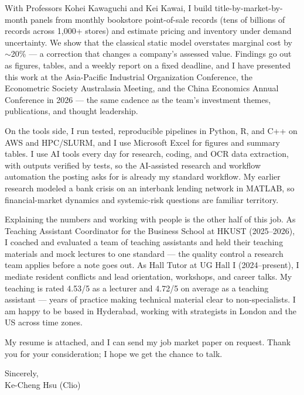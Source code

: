 \documentclass[11pt,letterpaper]{article}
\begin{document}
With Professors Kohei Kawaguchi and Kei Kawai, I build title-by-market-by-month panels from monthly bookstore point-of-sale records (tens of billions of records across 1{,}000+ stores) and estimate pricing and inventory under demand uncertainty. We show that the classical static model overstates marginal cost by \(\sim\)20\% --- a correction that changes a company's assessed value. Findings go out as figures, tables, and a weekly report on a fixed deadline, and I have presented this work at the Asia-Pacific Industrial Organization Conference, the Econometric Society Australasia Meeting, and the China Economics Annual Conference in 2026 --- the same cadence as the team's investment themes, publications, and thought leadership.

On the tools side, I run tested, reproducible pipelines in Python, R, and C++ on AWS and HPC/SLURM, and I use Microsoft Excel for figures and summary tables. I use AI tools every day for research, coding, and OCR data extraction, with outputs verified by tests, so the AI-assisted research and workflow automation the posting asks for is already my standard workflow. My earlier research modeled a bank crisis on an interbank lending network in MATLAB, so financial-market dynamics and systemic-risk questions are familiar territory.

Explaining the numbers and working with people is the other half of this job. As Teaching Assistant Coordinator for the Business School at HKUST (2025--2026), I coached and evaluated a team of teaching assistants and held their teaching materials and mock lectures to one standard --- the quality control a research team applies before a note goes out. As Hall Tutor at UG Hall I (2024--present), I mediate resident conflicts and lead orientation, workshops, and career talks. My teaching is rated 4.53/5 as a lecturer and 4.72/5 on average as a teaching assistant --- years of practice making technical material clear to non-specialists. I am happy to be based in Hyderabad, working with strategists in London and the US across time zones.

My resume is attached, and I can send my job market paper on request. Thank you for your consideration; I hope we get the chance to talk.

\vspace{0.4em}
Sincerely,\\[0.3em]
Ke-Cheng Hsu (Clio)
\end{document}
